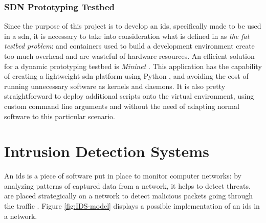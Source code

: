 \subsubsection{SDN Prototyping Testbed}
\label{subsec:sdn-testbed}

Since the purpose of this project is to develop an \gls{ids}, specifically made to be used in a \gls{sdn}, it is necessary to take into consideration what is defined in \cite{Lantz2015} as \textit{the fat testbed problem}:  and containers used to build a development environment create too much overhead and are wasteful of hardware resources. An efficient solution for a dynamic prototyping testbed is \textit{Mininet} \cite{MininetWebsite}. This application has the capability of creating a lightweight \gls{sdn} platform using Python , and avoiding the cost of running unnecessary software as kernels and daemons. It is also pretty straightforward to deploy additional scripts onto the virtual environment, using custom command line arguments and without the need of adapting normal software to this particular scenario.


\section{Intrusion Detection Systems}
\label{sec:intrusion-detection-system}

An \gls{ids} is a piece of software put in place to monitor computer networks: by analyzing patterns of captured data from a network, it helps to detect threats.  are placed strategically on a network to detect malicious packets going through the traffic \cite{Hodo2017}. Figure \ref{fig:IDS-model} displays a possible implementation of an \gls{ids} in a network.


